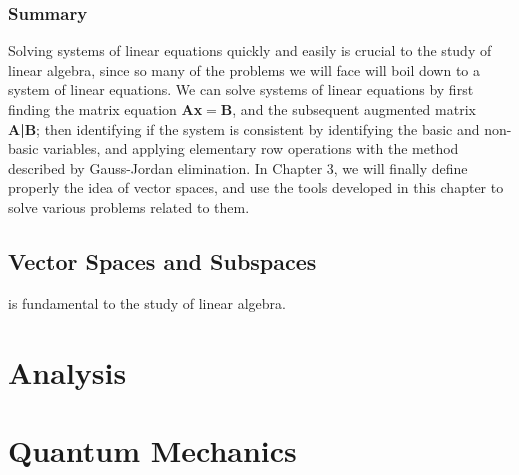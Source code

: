 \documentclass{tufte-book}
\begin{document}
\section{Summary}

Solving systems of linear equations quickly and easily is crucial to the study of linear algebra, since so many of the
problems we will face will boil down to a system of linear equations. We can solve systems of linear equations by
first finding the matrix equation \textbf{Ax}$=$\textbf{B}, and the subsequent augmented matrix \textbf{A|B}; then identifying
if the system is consistent by identifying the basic and non-basic variables, and applying elementary row operations with
the method described by Gauss-Jordan elimination. In Chapter 3, we will finally define properly the idea of vector spaces,
and use the tools developed in this chapter to solve various problems related to them.



\chapter{Vector Spaces and Subspaces}

 is fundamental to the study of linear algebra.

\part{Analysis}
\part{Quantum Mechanics}



\end{document}
